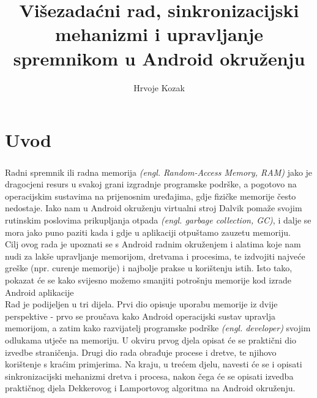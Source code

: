 \documentclass[times, utf8, zavrsni]{fer}
\begin{document}

\title{Višezadaćni rad, sinkronizacijski mehanizmi i upravljanje spremnikom u Android okruženju}

\author{Hrvoje Kozak}

\maketitle


\zahvala{}

\tableofcontents

\chapter{Uvod}
\paragraph{}
Radni spremnik ili radna memorija \textit{(engl. Random-Access Memory, RAM)} jako je dragocjeni resurs u svakoj grani izgradnje programske podrške, a pogotovo na operacijskim sustavima na prijenosnim uređajima, gdje fizičke memorije često nedostaje. Iako nam u Android okruženju virtualni stroj Dalvik pomaže svojim rutinskim poslovima prikupljanja otpada \textit{(engl. garbage collection, GC)}, i dalje se mora jako puno paziti kada i gdje u aplikaciji otpuštamo zauzetu memoriju.\\

Cilj ovog rada je upoznati se s Android radnim okruženjem i alatima koje nam nudi za lakše upravljanje memorijom, dretvama i procesima, te izdvojiti najveće greške (npr. curenje memorije) i najbolje prakse u korištenju istih. Isto tako, pokazat će se kako svijesno možemo smanjiti potrošnju memorije kod izrade Android aplikacije\\

Rad je podijeljen u tri dijela. Prvi dio opisuje uporabu memorije iz dvije perspektive - prvo se proučava kako Android operacijski sustav upravlja memorijom, a zatim kako razvijatelj programske podrške \textit{(engl. developer)} svojim odlukama utječe na memoriju. U okviru prvog djela opisat će se praktični dio izvedbe straničenja. Drugi dio rada obrađuje procese i dretve, te njihovo korištenje s kraćim primjerima. Na kraju, u trećem djelu, navesti će se i opisati sinkronizacijski mehanizmi dretva i procesa, nakon čega će se opisati izvedba praktičnog djela Dekkerovog i Lamportovog algoritma na Android okruženju.\\
\end{document}
